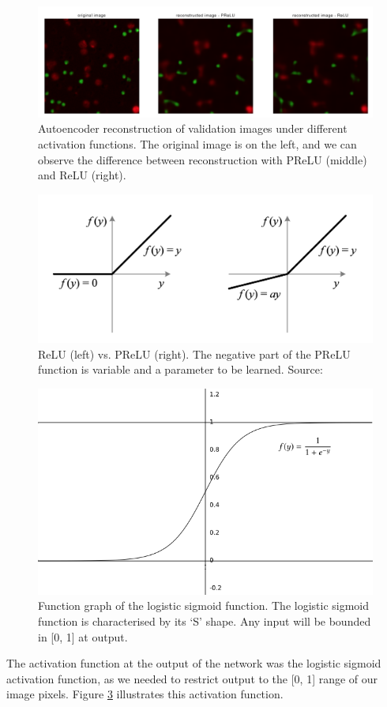 \begin{figure}
    \centering
    \includegraphics[width=.9\textwidth]{dissertation/figures/relu_prelu_reconstruction.png}
    \caption{Autoencoder reconstruction of validation images under different activation functions. The original image is on the left, and we can observe the difference between reconstruction with PReLU (middle) and ReLU (right).}
    \label{fig:relu_prelu_reconstruction}
\end{figure}

\begin{figure}[h!]
    \centering
    \includegraphics[width=.55\textwidth]{dissertation/figures/relu_prelu.png}
    \caption{ReLU (left) vs. PReLU (right). The negative part of the PReLU function is variable and a parameter to be learned. Source: \citet{he_2015}}
    \label{fig:relu_prelu}
\end{figure}

\begin{figure}[h!]
    \centering
    \includegraphics[width=.45\textwidth]{dissertation/figures/sigmoid.png}
    \caption{Function graph of the logistic sigmoid function. The logistic sigmoid function is characterised by its `S' shape. Any input will be bounded in [0, 1] at output.}
    \label{fig:sigmoid}
\end{figure}

The activation function at the output of the network was the logistic sigmoid activation function, as we needed to restrict output to the [0, 1] range of our image pixels. Figure \ref{fig:sigmoid} illustrates this activation function. 

